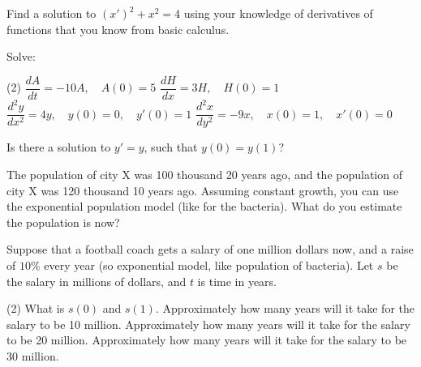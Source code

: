 \begin{exercise}
	Find a solution to
	${(x')}^2 + x^2 = 4$
	using your knowledge of derivatives of functions that you
	know from basic calculus.
\end{exercise}

\begin{exercise}
	Solve:
	\begin{tasks}(2)
		\task $\dfrac{dA}{dt} = -10 A, \quad A(0)=5$
		\task $\dfrac{dH}{dx} = 3 H, \quad H(0)=1$
		\task $\dfrac{d^2y}{dx^2} = 4 y, \quad y(0)=0, \quad y'(0)=1$
		\task $\dfrac{d^2x}{dy^2} = -9 x, \quad x(0)=1, \quad x'(0)=0$
	\end{tasks}
\end{exercise}


\begin{exercise}
	Is there a solution to $y' = y$, such that $y(0) = y(1)$?
\end{exercise}

\begin{exercise}
	The population of city X was 100 thousand 20 years ago, and 
	the population of city X was 120 thousand 10 years ago.  Assuming constant
	growth, you can use the exponential population model
	(like for the bacteria).  What do you estimate the population is now?
\end{exercise}

\begin{exercise}
	Suppose that a football coach gets a salary of
	one million dollars now, and a raise of $10\%$ every year
	(so exponential model, like population of bacteria).
	Let $s$ be the salary in millions of dollars, and $t$ is time in years.
	\begin{tasks}(2)
		\task
		What is $s(0)$ and $s(1)$.
		\task
		Approximately how many years will it take for the salary to be 10 million.
		\task
		Approximately how many years will it take for the salary to be 20 million.
		\task
		Approximately how many years will it take for the salary to be 30 million.
	\end{tasks}
\end{exercise}






